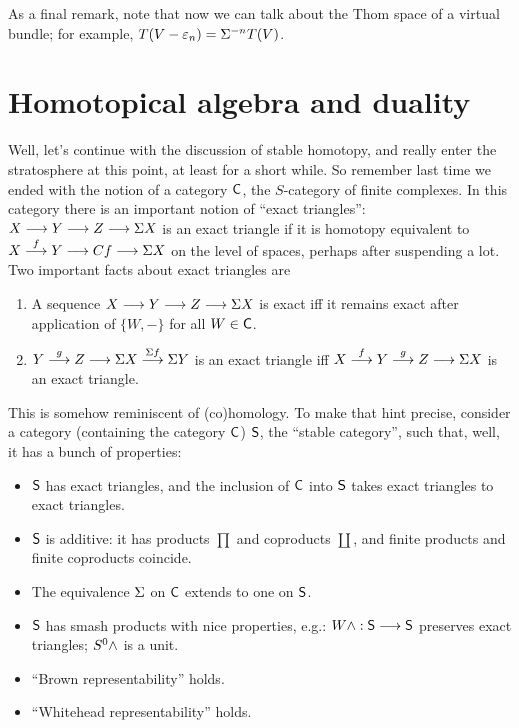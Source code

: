 As a final remark, note that now we can talk about the Thom space of a virtual bundle; for example, $T(V - \varepsilon_n) = \Sigma^{-n} T(V)$.

\fi
\BoxedNote{}
\section{Homotopical algebra and duality} %
\label{HomotopicalAlgebraAndDuality}
\ifx\OutputHomotopicalAlgebraAndDuality\undefined\else
Well, let's continue with the discussion of stable homotopy, and really enter the stratosphere at this point, at least for a short while.  So remember last time we ended with the notion of a category $\mathsf{C}$, the $S$-category of finite complexes.  In this category there is an important notion of ``exact triangles'': $X \longrightarrow Y \longrightarrow Z \longrightarrow \Sigma X$ is an exact triangle if it is homotopy equivalent to $X \stackrel{f}{\longrightarrow} Y \longrightarrow Cf \longrightarrow \Sigma X$ on the level of spaces, perhaps after suspending a lot.  Two important facts about exact triangles are
\begin{enumerate}
\item A sequence $X \longrightarrow Y \longrightarrow Z \longrightarrow \Sigma X$ is exact iff it remains exact after application of $\{W, -\}$ for all $W \in \mathsf{C}$.
\item $Y \stackrel{g}{\longrightarrow} Z \longrightarrow \Sigma X \stackrel{\Sigma f}{\longrightarrow} \Sigma Y$ is an exact triangle iff $X \stackrel{f}{\longrightarrow} Y \stackrel{g}{\longrightarrow} Z \longrightarrow \Sigma X$ is an exact triangle.
\end{enumerate}
This is somehow reminiscent of (co)homology. To make that hint precise, consider a category (containing the category $\mathsf{C}$) $\mathsf{S}$, the ``stable category'', such that, well, it has a bunch of properties:
\begin{itemize}
\item $\mathsf{S}$ has exact triangles, and the inclusion of $\mathsf{C}$ into $\mathsf{S}$ takes exact triangles to exact triangles.
\item $\mathsf{S}$ is additive: it has products $\prod$ and coproducts $\coprod$, and finite products and finite coproducts coincide.
\item The equivalence $\Sigma$ on $\mathsf{C}$ extends to one on $\mathsf{S}$.
\item $\mathsf{S}$ has smash products with nice properties, e.g.: $W \wedge: \mathsf{S} \longrightarrow \mathsf{S}$ preserves exact triangles; $S^0 \wedge$ is a unit.
\item ``Brown representability'' holds.
\item ``Whitehead representability'' holds.
\end{itemize}

